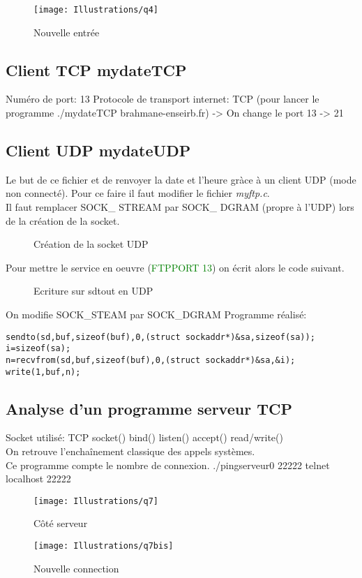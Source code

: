 \documentclass[paper=a4, fontsize=12pt]{article}
\numberwithin{equation}{section}		%
\numberwithin{figure}{section}			%
\numberwithin{table}{section}				%
\begin{document}
\begin{figure}[h!]
\centerline{\texttt{[image: Illustrations/q4]}}
\caption{\label{Illustrations/q4} Nouvelle entrée}
\end{figure}
\subsection{Client TCP mydateTCP}
Numéro de port: 13 Protocole de transport internet: TCP
(pour lancer le programme ./mydateTCP brahmane-enseirb.fr)
-> On change le port 13 -> 21
\subsection{Client UDP mydateUDP}
Le but de ce fichier et de renvoyer la date et l'heure gràce à un client UDP (mode non connecté). Pour ce faire il faut modifier le fichier \textit{myftp.c}.
\\
Il faut remplacer SOCK\_ STREAM par SOCK\_ DGRAM (propre à l'UDP) lors de la création de la socket.
\begin{figure}[h!]
\caption{\label{Illustrations/0}Création de la socket UDP}
\end{figure}

Pour mettre le service en oeuvre (\textcolor{green}{FTPPORT 13}) on écrit alors le code suivant.

\begin{figure}[h!]
\caption{\label{Illustrations/decoupage_etapes_2}Ecriture sur sdtout en UDP}
\end{figure}
On modifie SOCK\_STEAM par SOCK\_DGRAM
Programme réalisé:
\begin{verbatim}
sendto(sd,buf,sizeof(buf),0,(struct sockaddr*)&sa,sizeof(sa));
i=sizeof(sa);
n=recvfrom(sd,buf,sizeof(buf),0,(struct sockaddr*)&sa,&i);
write(1,buf,n);
\end{verbatim}
\subsection{Analyse d'un programme serveur TCP}
Socket utilisé: TCP
socket()
bind()
listen()
accept()
read/write()
\\On retrouve l'enchaînement classique des appels systèmes.
\\Ce programme compte le nombre de connexion.
./pingserveur0 22222
telnet localhost 22222
\begin{figure}[h!]
\centerline{\texttt{[image: Illustrations/q7]}}
\caption{\label{Illustrations/q7} Côté serveur}
\end{figure}
\begin{figure}[h!]
\centerline{\texttt{[image: Illustrations/q7bis]}}
\caption{\label{Illustrations/q7bis} Nouvelle connection}
\end{figure}
\end{document}
